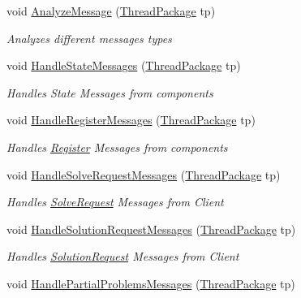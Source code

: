 \begin{DoxyCompactItemize}
\item 
void \hyperlink{class_communication_server_1_1_message_dispatcher_a52e2c5b8822535187f3b0bffcb591e55}{Analyze\+Message} (\hyperlink{class_communication_server_1_1_thread_package}{Thread\+Package} tp)
\begin{DoxyCompactList}\small\item\em Analyzes different messages types \end{DoxyCompactList}\item 
void \hyperlink{class_communication_server_1_1_message_dispatcher_a6b9ce154fa93df43deafb14853deda65}{Handle\+State\+Messages} (\hyperlink{class_communication_server_1_1_thread_package}{Thread\+Package} tp)
\begin{DoxyCompactList}\small\item\em Handles State Messages from components \end{DoxyCompactList}\item 
void \hyperlink{class_communication_server_1_1_message_dispatcher_a95026cfe10919dc54b5e7c36fd914ac8}{Handle\+Register\+Messages} (\hyperlink{class_communication_server_1_1_thread_package}{Thread\+Package} tp)
\begin{DoxyCompactList}\small\item\em Handles \hyperlink{class_register}{Register} Messages from components \end{DoxyCompactList}\item 
void \hyperlink{class_communication_server_1_1_message_dispatcher_aa6b578088c880c0e53350a4a4f6eb885}{Handle\+Solve\+Request\+Messages} (\hyperlink{class_communication_server_1_1_thread_package}{Thread\+Package} tp)
\begin{DoxyCompactList}\small\item\em Handles \hyperlink{class_solve_request}{Solve\+Request} Messages from Client \end{DoxyCompactList}\item 
void \hyperlink{class_communication_server_1_1_message_dispatcher_aaa48feaa1ebb84f174cd5a750a3d63a6}{Handle\+Solution\+Request\+Messages} (\hyperlink{class_communication_server_1_1_thread_package}{Thread\+Package} tp)
\begin{DoxyCompactList}\small\item\em Handles \hyperlink{class_solution_request}{Solution\+Request} Messages from Client \end{DoxyCompactList}\item 
void \hyperlink{class_communication_server_1_1_message_dispatcher_ac49238ac7a476766ba98a653d4ed3871}{Handle\+Partial\+Problems\+Messages} (\hyperlink{class_communication_server_1_1_thread_package}{Thread\+Package} tp)

\end{DoxyCompactItemize}
